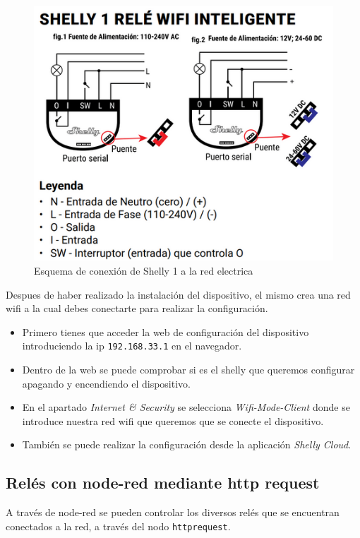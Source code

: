 \documentclass[11pt, letterpaper]{article}
\begin{document}
\begin{figure}[h]
	\centering
	\includegraphics[width=\textwidth]{conexion_Shelly1_red.png}
	\caption{Esquema de conexión de Shelly 1 a la red electrica} 
	\label{fig:conexion_Shelly1_red}
\end{figure}
\pagebreak
Despues de haber realizado la instalación del dispositivo, el mismo crea una red
wifi a la cual debes conectarte para realizar la configuración.
\begin{itemize}
    \item Primero tienes que acceder la web de configuración del 
    dispositivo introduciendo la ip \texttt{192.168.33.1} en el navegador.
    \item Dentro de la web se puede comprobar si es el shelly que queremos configurar apagando y encendiendo el dispositivo.
    \item En el apartado \textit{Internet \& Security} se selecciona \textit{Wifi-Mode-Client} donde se introduce nuestra red wifi que queremos que se conecte el dispositivo.
    \item También se puede realizar la configuración desde la aplicación \textit{Shelly Cloud}.
\end{itemize}

\subsection{Relés con node-red mediante http request}
A través de node-red se pueden controlar los diversos relés que se encuentran conectados a la red, a través
del nodo \texttt{httprequest}.\\
\end{document}
